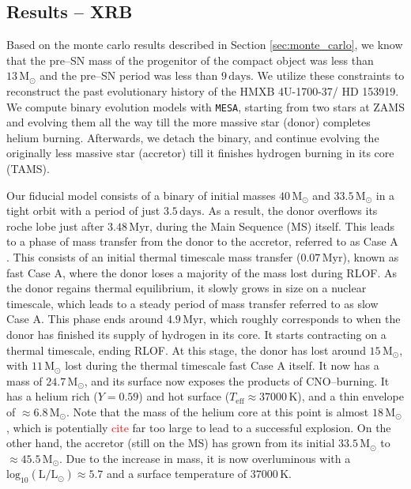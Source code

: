 \documentclass[linenumbers,trackchanges,twocolumn]{aastex701}
\newcommand{\Mdot}{\mathrm{M}_{\odot}}
\newcommand{\Ldot}{\mathrm{L}_{\odot}}
\newcommand{\red}{\textcolor{red}}
\begin{document}
\subsection{Results -- XRB}

Based on the monte carlo results described in Section \ref{sec:monte_carlo}, we know that the pre--SN mass of the progenitor of the compact object was less than $13\,\Mdot$ and the pre--SN period was less than $9\, \mathrm{days}$. We utilize these constraints to reconstruct the past evolutionary history of the HMXB 4U-1700-37/ HD 153919. We compute binary evolution models with \texttt{MESA}, starting from two stars at ZAMS and evolving them all the way till the more massive star (donor) completes helium burning. Afterwards, we detach the binary, and continue evolving the originally less massive star (accretor) till it finishes hydrogen burning in its core (TAMS). 

Our fiducial model consists of a binary of initial masses $40\,\Mdot$ and $33.5\,\Mdot$ in a tight orbit with a period of just $3.5\,\mathrm{days}$. As a result, the donor overflows its roche lobe just after $3.48 \,\mathrm{Myr}$, during the Main Sequence (MS) itself. This leads to a phase of mass transfer from the donor to the accretor, referred to as Case A \citep{1967ZA.....65..251K}. This consists of an initial thermal timescale mass transfer ($0.07\, \mathrm{Myr}$), known as fast Case A, where the donor loses a majority of the mass lost during RLOF. As the donor regains thermal equilibrium, it slowly grows in size on a nuclear timescale, which leads to a steady period of mass transfer referred to as slow Case A. This phase ends around $4.9\,\mathrm{Myr}$, which roughly corresponds to when the donor has finished its supply of hydrogen in its core. It starts contracting on a thermal timescale, ending RLOF. At this stage, the donor has lost around $15\,\Mdot$, with $11\,\Mdot$ lost during the thermal timescale fast Case A itself. It now has a mass of $24.7\,\Mdot$, and its surface now exposes the products of CNO--burning. It has a helium rich ($Y = 0.59$) and hot surface ($T_{\mathrm{eff}} \approx 37000\,\mathrm{K}$), and a thin envelope of $\approx 6.8\,\Mdot$. Note that the mass of the helium core at this point is almost $18\,\Mdot$, which is potentially \red{cite} far too large to lead to a successful explosion. On the other hand, the accretor (still on the MS) has grown from its initial $33.5\,\Mdot$ to $\approx 45.5\,\Mdot$. Due to the increase in mass, it is now overluminous with a $\mathrm{log_{10}}(\mathrm{L}/\Ldot) \approx 5.7$ and a surface temperature of $37000\,\mathrm{K}$.
\end{document}
